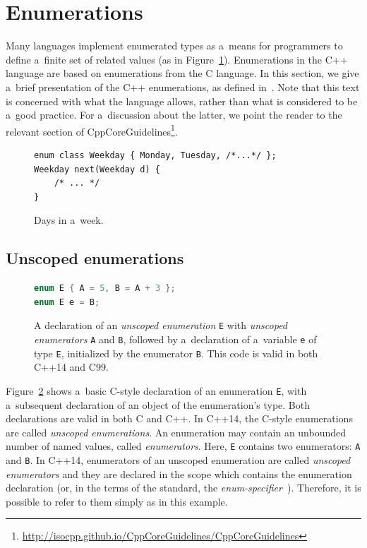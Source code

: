 \documentclass[nolot,nolof,nocover,printed]{fithesis3}
\newcommand{\stdN}[2]{\cite[#2]{#1}\xspace}
\begin{document}
\section{Enumerations}

Many languages implement enumerated types as a~means for programmers to define a~finite set of related values (as in Figure~\ref{fig:daysInWeek}). Enumerations in the C++ language are based on enumerations from the C language. In this section, we give a~brief presentation of the C++ enumerations, as defined in~\cite{n4296}. Note that this text is concerned with what the language allows, rather than what is considered to be a~good practice. For a~discussion about the latter, we point the reader to the relevant section of CppCoreGuidelines\footnote{\url{http://isocpp.github.io/CppCoreGuidelines/CppCoreGuidelines}}. 

\begin{figure}[ht]
\begin{lstlisting}
enum class Weekday { Monday, Tuesday, /*...*/ };
Weekday next(Weekday d) {
    /* ... */
}
\end{lstlisting}
\caption{Days in a~week.}
\label{fig:daysInWeek}
\end{figure}

\subsection{Unscoped enumerations}

\begin{figure}[ht]
\begin{lstlisting}[language=C++]
enum E { A = 5, B = A + 3 };
enum E e = B;
\end{lstlisting}
\caption{A declaration of an \textit{unscoped enumeration} \lstinline|E| with \textit{unscoped enumerators} \lstinline|A| and \lstinline|B|, followed by a~declaration of a~variable \lstinline|e| of type \lstinline|E|, initialized by the enumerator \lstinline|B|. This code is valid in both C++14 and C99.}
\label{CStyleEnumDeclaration}
\end{figure}

Figure~\ref{CStyleEnumDeclaration} shows a~basic C-style declaration of an enumeration \lstinline|E|, with a~subsequent declaration of an object of the enumeration's type. Both declarations are valid in both C and C++. In C++14, the C-style enumerations are called \textit{unscoped enumerations}. An enumeration may contain an unbounded number of named values, called \textit{enumerators}. Here, \lstinline|E| contains two enumerators: \lstinline|A| and \lstinline|B|. In C++14, enumerators of an unscoped enumeration are called \textit{unscoped enumerators} and they are declared in the scope which contains the enumeration declaration (or, in the terms of the standard, the \textit{enum-specifier}~\stdN{n4296}{\S 7.2/11}). Therefore, it is possible to refer to them simply as in this example.
\end{document}
